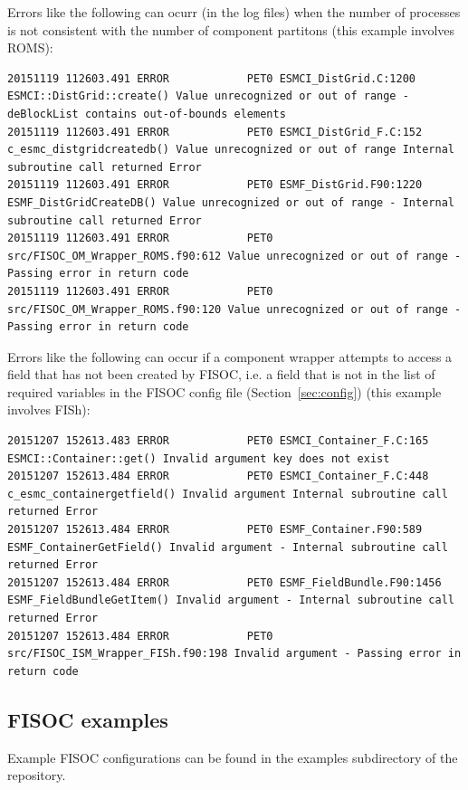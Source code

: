 \documentclass[11pt]{article}
\begin{document}
Errors like the following can ocurr (in the log files) when the number of processes is 
not consistent with the number of component partitons (this example involves ROMS):
\begin{lstlisting}
20151119 112603.491 ERROR            PET0 ESMCI_DistGrid.C:1200 ESMCI::DistGrid::create() Value unrecognized or out of range - deBlockList contains out-of-bounds elements
20151119 112603.491 ERROR            PET0 ESMCI_DistGrid_F.C:152 c_esmc_distgridcreatedb() Value unrecognized or out of range Internal subroutine call returned Error
20151119 112603.491 ERROR            PET0 ESMF_DistGrid.F90:1220 ESMF_DistGridCreateDB() Value unrecognized or out of range - Internal subroutine call returned Error
20151119 112603.491 ERROR            PET0 src/FISOC_OM_Wrapper_ROMS.f90:612 Value unrecognized or out of range - Passing error in return code
20151119 112603.491 ERROR            PET0 src/FISOC_OM_Wrapper_ROMS.f90:120 Value unrecognized or out of range - Passing error in return code
\end{lstlisting}

Errors like the following can occur if a component wrapper attempts to access a field 
that has not been created by FISOC, i.e. a field that is not in the list of
required variables in the FISOC config file (Section~\ref{sec:config}) 
(this example involves FISh):
\begin{lstlisting}
20151207 152613.483 ERROR            PET0 ESMCI_Container_F.C:165 ESMCI::Container::get() Invalid argument key does not exist
20151207 152613.484 ERROR            PET0 ESMCI_Container_F.C:448 c_esmc_containergetfield() Invalid argument Internal subroutine call returned Error
20151207 152613.484 ERROR            PET0 ESMF_Container.F90:589 ESMF_ContainerGetField() Invalid argument - Internal subroutine call returned Error
20151207 152613.484 ERROR            PET0 ESMF_FieldBundle.F90:1456 ESMF_FieldBundleGetItem() Invalid argument - Internal subroutine call returned Error
20151207 152613.484 ERROR            PET0 src/FISOC_ISM_Wrapper_FISh.f90:198 Invalid argument - Passing error in return code
\end{lstlisting}





\subsection{FISOC examples}

Example FISOC configurations can be found in the 
examples subdirectory of the repository. 
\end{document}
